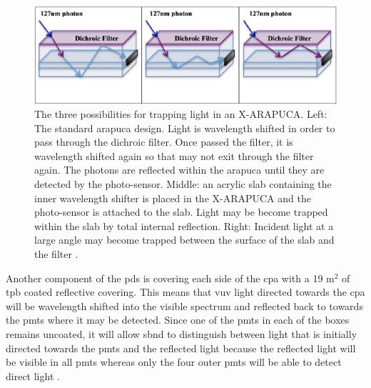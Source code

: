 \begin{figure}[!h]
    \centering
    \includegraphics[width = \largefigwidth]{figures-chap3/arapuca.png}
    \caption[ARAPUCA operating principle.]{The three possibilities for trapping light in an X-ARAPUCA. Left: The standard \gls{arapuca} design. Light is wavelength shifted in order to pass through the dichroic filter. Once passed the filter, it is wavelength shifted again so that may not exit through the filter again. The photons are reflected within the \gls{arapuca} until they are detected by the photo-sensor. Middle: an acrylic slab containing the inner wavelength shifter is placed in the X-ARAPUCA and the photo-sensor is attached to the slab. Light may be become trapped within the slab by total internal reflection. Right: Incident light at a large angle may become trapped between the surface of the slab and the filter \cite{X-ARAPUCA}.}
    \label{fig:arapuca}
\end{figure}

Another component of the \gls{pds} is covering each side of the \gls{cpa} with a 19 m$^2$ of \gls{tpb} coated reflective covering. This means that \gls{vuv} light directed towards the \gls{cpa} will be wavelength shifted into the visible spectrum and reflected back to towards the \glspl{pmt} where it may be detected. Since one of the \glspl{pmt} in each of the boxes remains uncoated, it will allow \gls{sbnd} to distinguish between light that is initially directed towards the \glspl{pmt} and the reflected light because the reflected light will be visible in all \glspl{pmt} whereas only the four outer \glspl{pmt} will be able to detect direct light \cite{LArTPC_review}. 

